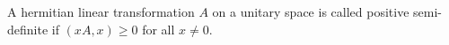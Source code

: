 A hermitian linear transformation $A$ on a unitary space is called positive semi-definite if $(xA, x) \geq 0$ for all $x \neq 0$.
